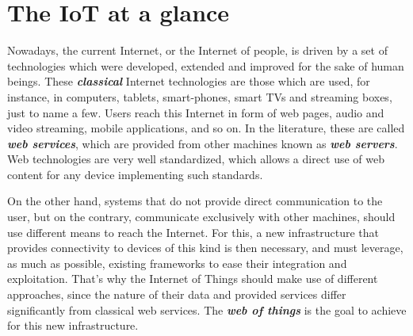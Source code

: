 


\section{The IoT at a glance}
\label{subsec:IoTAtAGlance}
Nowadays, the current Internet, or the Internet of people, is driven by a set of technologies which were developed, extended and improved for the sake of human beings.
These \textit{\textbf{classical}} Internet technologies are those which are used, for instance, in computers, tablets, smart-phones, smart TVs and streaming boxes, just to name a few.
Users reach this Internet in form of web pages, audio and video streaming, mobile applications, and so on.
In the literature, these are called \textit{\textbf{web services}}, which are provided from other machines known as \textit{\textbf{web servers}}.
Web technologies are very well standardized, which allows a direct use of web content for any device implementing such standards.

On the other hand, systems that do not provide direct communication to the user, but on the contrary, communicate exclusively with other machines, should use different means to reach the Internet.
For this, a new infrastructure that provides connectivity to devices of this kind is then necessary, and must leverage, as much as possible, existing frameworks to ease their integration and exploitation.
That's why the Internet of Things should make use of different approaches, since the nature of their data and provided services differ significantly from classical web services.
The \textit{\textbf{web of things}}\cite{duquennoy2009webofthings} is the goal to achieve for this new infrastructure.

